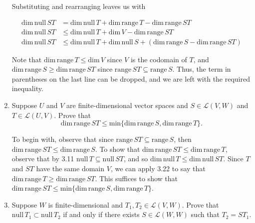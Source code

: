 \documentclass{book}
\begin{document}
\begin{enumerate}
Substituting and rearranging leaves us with

\begin{equation*}
    \begin{split}
        \textrm{dim} \, \textrm{null} \, ST &= \textrm{dim} \, \textrm{null} \, T + \textrm{dim} \, \textrm{range} \, T - \textrm{dim} \, \textrm{range} \, ST \\
        \textrm{dim} \, \textrm{null} \, ST &\leq \textrm{dim} \, \textrm{null} \, T + \textrm{dim} \, V - \textrm{dim} \, \textrm{range} \, ST \\
        \textrm{dim} \, \textrm{null} \, ST &\leq \textrm{dim} \, \textrm{null} \, T + \textrm{dim} \, \textrm{null} \, S + (\textrm{dim} \, \textrm{range} \, S - \textrm{dim} \, \textrm{range} \, ST)
    \end{split}
\end{equation*}

Note that \(\text{dim} \, \text{range} \, T \leq \text{dim} \, V\) since \(V\) is the codomain of \(T\), and \(\textrm{dim} \, \textrm{range} \, S \geq \textrm{dim} \, \textrm{range} \, ST\) since \(\textrm{range} \, ST \subseteq \textrm{range} \, S\).  Thus, the term in parentheses on the last line can be dropped, and we are left with the required inequality.

\item Suppose \(U\) and \(V\) are finite-dimensional vector spaces and \(S \in \mathcal{L}(V,W)\) and \(T \in \mathcal{L}(U,V)\).  Prove that \[\textrm{dim} \, \textrm{range} \, ST \leq \textrm{min}\{\textrm{dim} \, \textrm{range} \, S, \textrm{dim} \, \textrm{range} \, T\}.\]

To begin with, observe that since \(\textrm{range} \, ST \subseteq \textrm{range} \, S\), then \(\textrm{dim} \, \textrm{range} \, ST \leq \textrm{dim} \, \textrm{range} \, S\).  To show that \(\textrm{dim} \, \textrm{range} \, ST \leq \textrm{dim} \, \textrm{range} \, T\), observe that by 3.11 \(\textrm{null} \, T \subseteq \textrm{null} \, ST\), and so \(\textrm{dim} \, \textrm{null} \, T \leq \textrm{dim} \, \textrm{null} \, ST\).  Since \(T\) and \(ST\) have the same domain \(V\), we can apply 3.22 to say that \(\textrm{dim} \, \textrm{range} \, T \geq \textrm{dim} \, \textrm{range} \, ST\).  This suffices to show that \(\textrm{dim} \, \textrm{range} \, ST \leq \textrm{min}\{\textrm{dim} \, \textrm{range} \, S, \textrm{dim} \, \textrm{range} \, T\}\).

\item Suppose \(W\) is finite-dimensional and \(T_1,T_2 \in \mathcal{L}(V,W)\).  Prove that \(\textrm{null} \, T_1 \subset \textrm{null} \, T_2\) if and only if there exists \(S \in \mathcal{L}(W,W)\) such that \(T_2=ST_1\).


\end{enumerate}
\end{document}
